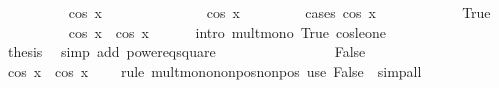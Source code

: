 \begin{isabellebody}
\ \ \ \ \isamarkupfalse%
\ {\isachardoublequoteopen}{}\ {\isasymle}\ {}\ {\isacharslash}{\kern0pt}\ {\isacharparenleft}{\kern0pt}cos\ x{\isacharparenright}{\kern0pt}\ {\isacharminus}{\kern0pt}\ {}{\isachardoublequoteclose}\isanewline
\ \ \ \ \isamarkupfalse%
{\isacharminus}{\kern0pt}\isanewline
\ \ \ \ \ \ \isamarkupfalse%
\ {\isachardoublequoteopen}{\isacharparenleft}{\kern0pt}cos\ x{\isacharparenright}{\kern0pt}\ {\isasymle}\ {}{\isachardoublequoteclose}\isanewline
\ \ \ \ \ \ \isamarkupfalse%
{\isacharparenleft}{\kern0pt}cases\ {\isachardoublequoteopen}cos\ x\ {\isasymge}\ {}{\isachardoublequoteclose}{\isacharparenright}{\kern0pt}\isanewline
\ \ \ \ \ \ \ \ \isamarkupfalse%
\ True\isanewline
\ \ \ \ \ \ \ \ \isamarkupfalse%
\ {\isachardoublequoteopen}cos\ x\ {\isacharasterisk}{\kern0pt}\ cos\ x\ {\isasymle}\ {}\ {\isacharasterisk}{\kern0pt}\ {}{\isachardoublequoteclose}\ \isamarkupfalse%
\ {\isacharparenleft}{\kern0pt}intro\ mult{\isacharunderscore}{\kern0pt}mono{\isacharprime}{\kern0pt}\ True\ cos{\isacharunderscore}{\kern0pt}le{\isacharunderscore}{\kern0pt}one{\isacharparenright}{\kern0pt}\isanewline
\ \ \ \ \ \ \ \ \isamarkupfalse%
\ \isamarkupfalse%
\ {\isacharquery}{\kern0pt}thesis\ \isamarkupfalse%
\ {\isacharparenleft}{\kern0pt}simp\ add{\isacharcolon}{\kern0pt}\ power{}{\isacharunderscore}{\kern0pt}eq{\isacharunderscore}{\kern0pt}square{\isacharparenright}{\kern0pt}\isanewline
\ \ \ \ \ \ \isamarkupfalse%
\isanewline
\ \ \ \ \ \ \ \ \isamarkupfalse%
\ False\isanewline
\ \ \ \ \ \ \ \ \isamarkupfalse%
\ {\isachardoublequoteopen}cos\ x\ {\isacharasterisk}{\kern0pt}\ cos\ x\ {\isasymle}\ {\isacharparenleft}{\kern0pt}{\isacharminus}{\kern0pt}{}{\isacharparenright}{\kern0pt}{\isacharasterisk}{\kern0pt}{\isacharparenleft}{\kern0pt}{\isacharminus}{\kern0pt}{}{\isacharparenright}{\kern0pt}{\isachardoublequoteclose}\ \isamarkupfalse%
\ {\isacharparenleft}{\kern0pt}rule\ mult{\isacharunderscore}{\kern0pt}mono{\isacharunderscore}{\kern0pt}nonpos{\isacharunderscore}{\kern0pt}nonpos{\isacharparenright}{\kern0pt}\ {\isacharparenleft}{\kern0pt}use\ False\ \ simp{\isacharunderscore}{\kern0pt}all{\isacharparenright}{\kern0pt}\isanewline

\end{isabellebody}
